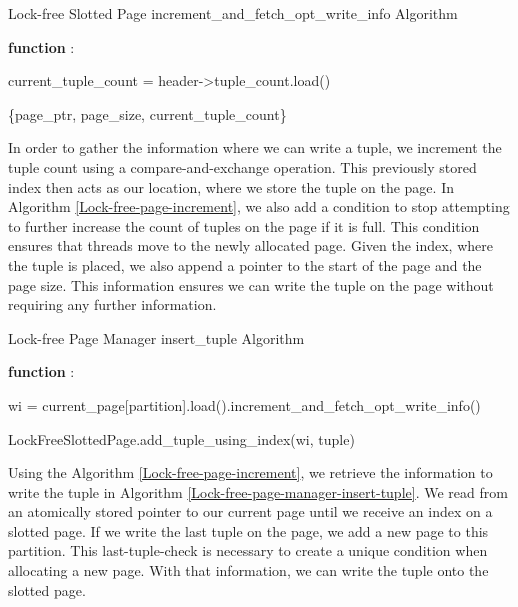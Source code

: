\begin{algorithm}[h]
  \caption{Lock-free Slotted Page increment\_and\_fetch\_opt\_write\_info Algorithm}
  \label{Lock-free-page-increment}

  \textbf{function} \Increment{}:

  current\_tuple\_count = header->tuple\_count.load()


  \Return \{page\_ptr, page\_size, current\_tuple\_count\}
\end{algorithm}
In order to gather the information where we can write a tuple, we increment the tuple count using a compare-and-exchange operation.
This previously stored index then acts as our location, where we store the tuple on the page.
In Algorithm \ref{Lock-free-page-increment}, we also add a condition to stop attempting to further increase the count of tuples on the page if it is full.
This condition ensures that threads move to the newly allocated page.
Given the index, where the tuple is placed, we also append a pointer to the start of the page and the page size.
This information ensures we can write the tuple on the page without requiring any further information.

\begin{algorithm}[h]
  \caption{Lock-free Page Manager insert\_tuple Algorithm}
  \label{Lock-free-page-manager-insert-tuple}



  \textbf{function} :

  wi = current\_page[partition].load().increment\_and\_fetch\_opt\_write\_info()



  LockFreeSlottedPage.add\_tuple\_using\_index(wi, tuple) \end{algorithm} Using the Algorithm \ref{Lock-free-page-increment}, we retrieve the information to write the tuple in Algorithm \ref{Lock-free-page-manager-insert-tuple}.
We read from an atomically stored pointer to our current page until we receive an index on a slotted page.
If we write the last tuple on the page, we add a new page to this partition.
This last-tuple-check is necessary to create a unique condition when allocating a new page.
With that information, we can write the tuple onto the slotted page.
